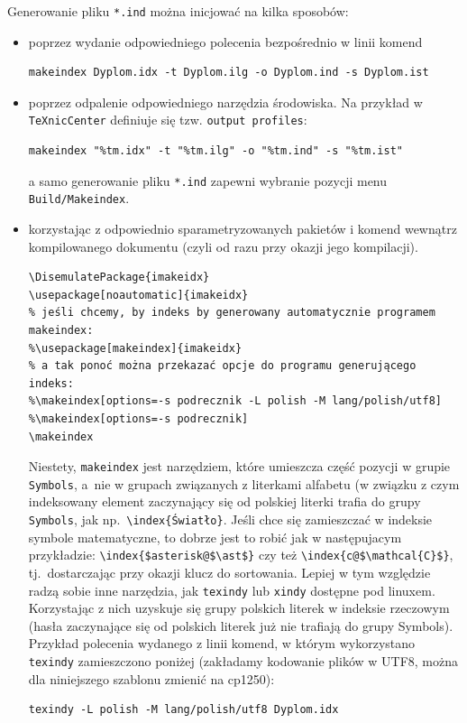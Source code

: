 Generowanie pliku \texttt{*.ind} można inicjować na kilka sposobów:
\begin{itemize}
\item poprzez wydanie odpowiedniego polecenia bezpośrednio w linii komend 
\begin{lstlisting}[basicstyle=\footnotesize\ttfamily]
makeindex Dyplom.idx -t Dyplom.ilg -o Dyplom.ind -s Dyplom.ist
\end{lstlisting}
\item poprzez odpalenie odpowiedniego narzędzia środowiska. Na przykład w \texttt{TeXnicCenter} definiuje się tzw. \texttt{output profiles}: 
\begin{lstlisting}[basicstyle=\footnotesize\ttfamily]
makeindex "%tm.idx" -t "%tm.ilg" -o "%tm.ind" -s "%tm.ist"
\end{lstlisting}
a samo generowanie pliku \texttt{*.ind} zapewni wybranie pozycji menu \texttt{Build/Makeindex}.
\item korzystając z odpowiednio sparametryzowanych pakietów i komend wewnątrz kompilowanego dokumentu (czyli od razu przy okazji jego kompilacji).
\begin{lstlisting}[basicstyle=\footnotesize\ttfamily]
\DisemulatePackage{imakeidx}
\usepackage[noautomatic]{imakeidx} 
% jeśli chcemy, by indeks by generowany automatycznie programem makeindex:
%\usepackage[makeindex]{imakeidx} 
% a tak ponoć można przekazać opcje do programu generującego indeks:
%\makeindex[options=-s podrecznik -L polish -M lang/polish/utf8] 
%\makeindex[options=-s podrecznik]
\makeindex
\end{lstlisting}

Niestety, \texttt{makeindex} jest narzędziem, które umieszcza część pozycji w grupie \texttt{Symbols}, a~nie w grupach związanych z literkami alfabetu (w związku z czym indeksowany element zaczynający się od polskiej literki trafia do grupy \texttt{Symbols}, jak np.~\verb?\index{Światło}?. Jeśli chce się zamieszczać w indeksie symbole matematyczne, to dobrze jest to robić jak w następujacym przykładzie: \verb?\index{$asterisk@$\ast$}?  czy też \verb?\index{c@$\mathcal{C}$}?, tj.~dostarczając przy okazji klucz do sortowania.
Lepiej w tym względzie radzą sobie inne narzędzia, jak \texttt{texindy} lub \texttt{xindy} dostępne pod linuxem. Korzystając z nich uzyskuje się grupy polskich literek w indeksie rzeczowym (hasła zaczynające się od polskich literek już nie trafiają do grupy Symbols). Przykład polecenia wydanego z linii komend, w którym wykorzystano \texttt{texindy} zamieszczono poniżej (zakładamy kodowanie plików w UTF8, można dla niniejszego szablonu zmienić na cp1250):
\begin{lstlisting}[basicstyle=\footnotesize\ttfamily]
texindy -L polish -M lang/polish/utf8 Dyplom.idx
\end{lstlisting}


\end{itemize}
